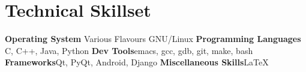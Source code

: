 \section {Technical Skillset}
\cvcomputer
{\textbf{Operating System}} {Various Flavours GNU/Linux}
{\textbf{Programming Languages}} {C, C++, Java, Python}
\cvcomputer
{\textbf{Dev Tools}}{emacs, gcc, gdb, git, make, bash}
{\textbf{Frameworks}}{Qt, PyQt, Android, Django}
\cvcomputer
{\textbf{Miscellaneous Skills}}{\LaTeX{}}
{}{}
